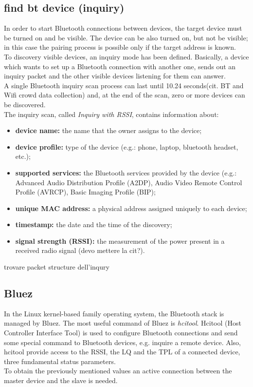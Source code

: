\subsection{find bt device (inquiry)}
In order to start Bluetooth connections between devices, the target device must be turned on and be visible. The device can be also turned on, but not be visible; in this case the pairing process is possible only if the target address is known.\\
To discovery visible devices, an inquiry mode has been defined. Basically, a device which wants to set up a Bluetooth connection with another one, sends out an inquiry packet and the other visible devices listening for them can answer.\\
A single Bluetooth inquiry scan process can last until 10.24 seconds(cit. BT and Wifi crowd data collection) and, at the end of the scan, zero or more devices can be discovered. \\
The inquiry scan, called \textit{Inquiry with RSSI}, contains information about:
\begin{itemize}
\item \textbf{device name:} the name that the owner assigns to the device;
\item \textbf{device profile:} type of the device (e.g.: phone, laptop, bluetooth headset, etc.);
\item \textbf{supported services:} the Bluetooth services provided by the device (e.g.: Advanced Audio Distribution Profile (A2DP), Audio Video Remote Control Profile (AVRCP), Basic Imaging Profile (BIP);
\item \textbf{unique MAC address:} a physical address assigned uniquely to each device;
\item \textbf{timestamp:} the date and the time of the discovery;
\item \textbf{signal strength (RSSI):} the measurement of the power present in a received radio signal (devo mettere la cit?).
\end{itemize}
trovare packet structure dell'inqury

\subsection{Bluez}
In the Linux kernel-based family operating system, the Bluetooth stack is managed by Bluez.
The most useful command of Bluez is \textit{hcitool}. Hcitool (Host Controller Interface Tool) is used to configure Bluetooth connections and send some special command to Bluetooth devices, e.g. inquire a remote device.
Also, hcitool provide access to the RSSI, the LQ and the TPL of a connected device, three fundamental status parameters.\\
To obtain the previously mentioned values an active connection between the master device and the slave is needed.

